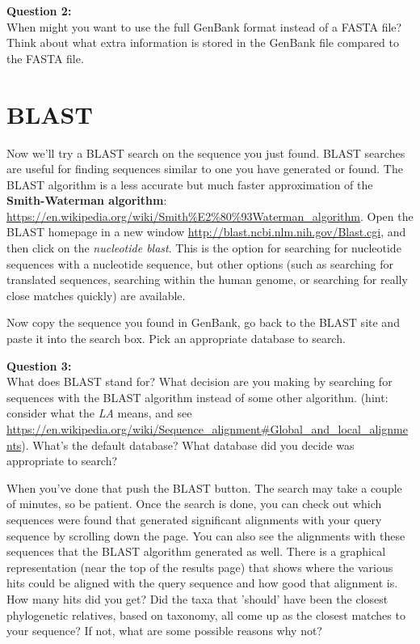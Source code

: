 \documentclass[11pt]{article}
\begin{document}
\begin{framed}
\noindent
\textbf{Question 2:} \\
When might you want to use the full GenBank format instead of a FASTA file?
Think about what extra information is stored in the GenBank file compared to the FASTA file.
\end{framed}


\section{BLAST}
Now we'll try a BLAST search on the sequence you just found. 
BLAST searches are useful for finding sequences similar to one you have generated or found. 
The BLAST algorithm is a less accurate but much faster approximation of the \textbf{Smith-Waterman algorithm}:
\url{https://en.wikipedia.org/wiki/Smith%E2%80%93Waterman_algorithm}.
Open the BLAST homepage in a new window \url{http://blast.ncbi.nlm.nih.gov/Blast.cgi}, 
and then click on the \textit{nucleotide blast}. 
This is the option for searching for nucleotide sequences with a nucleotide sequence, 
but other options (such as searching for translated sequences, 
searching within the human genome, or searching for really close matches quickly) are available.

Now copy the sequence you found in GenBank, go back to the BLAST site and paste it into the search box. 
Pick an appropriate database to search.

\begin{framed}
\noindent
\textbf{Question 3:} \\
What does BLAST stand for? 
What decision are you making by searching for sequences with the BLAST algorithm instead of some other algorithm. 
(hint: consider what the \textit{LA} means, and see \url{https://en.wikipedia.org/wiki/Sequence_alignment#Global_and_local_alignments}).
What's the default database? What database did you decide was appropriate to search?
\end{framed}

When you've done that push the BLAST button. The search may take a couple of minutes, so be patient.
Once the search is done, you can check out which sequences were found that generated 
significant alignments with your query sequence by scrolling down the page. 
You can also see the alignments with these sequences that the BLAST algorithm generated as well. 
There is a graphical representation (near the top of the results page) 
that shows where the various hits could be aligned with the query sequence and how good that alignment is.
How many hits did you get? Did the taxa that 'should' have been the closest phylogenetic relatives, 
based on taxonomy, all come up as the closest matches to your sequence? If not, what are some possible reasons why not?
\end{document}

